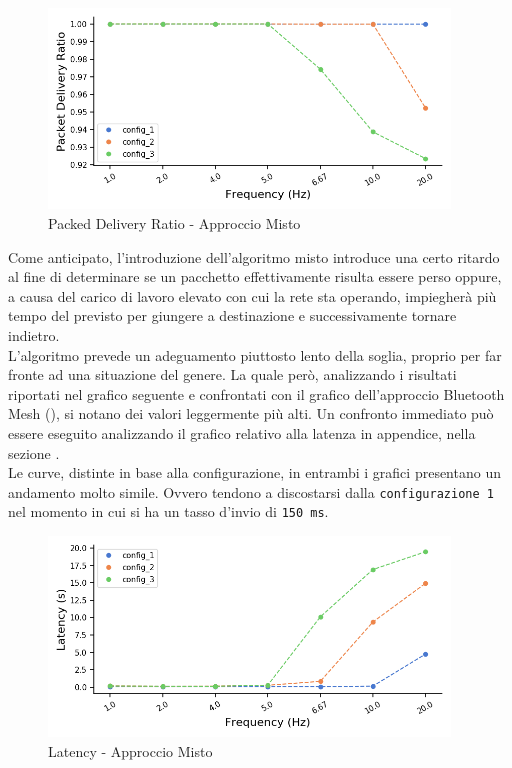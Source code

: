 \begin{figure}[hbt!]
    \centering
    \includegraphics[width = 0.95\textwidth]{images/graphs/ble_wifi_pdr.png}
    \caption{Packed Delivery Ratio - Approccio Misto}
    \label{graph:ble_wifi_pdr}
\end{figure}

\noindent Come anticipato, l'introduzione dell'algoritmo misto introduce una certo ritardo al fine di determinare se un pacchetto effettivamente risulta essere perso oppure, a causa del carico di lavoro elevato con cui la rete sta operando, impiegherà più tempo del previsto per giungere a destinazione e successivamente tornare indietro.\\
L'algoritmo prevede un adeguamento piuttosto lento della soglia, proprio per far fronte ad una situazione del genere. La quale però, analizzando i risultati riportati nel grafico seguente e confrontati con il grafico dell'approccio Bluetooth Mesh (), si notano dei valori leggermente più alti. Un confronto immediato può essere eseguito analizzando il grafico relativo alla latenza in appendice, nella sezione .\\
Le curve, distinte in base alla configurazione, in entrambi i grafici presentano un andamento molto simile. Ovvero tendono a discostarsi dalla \texttt{configurazione 1} nel momento in cui si ha un tasso d'invio di \texttt{150 ms}.

\begin{figure}[hbt!]
    \centering
    \includegraphics[width = 0.95\textwidth]{images/graphs/ble_wifi_latency.png}
    \caption{Latency - Approccio Misto}
    \label{graph:ble_wifi_latency}
\end{figure}

